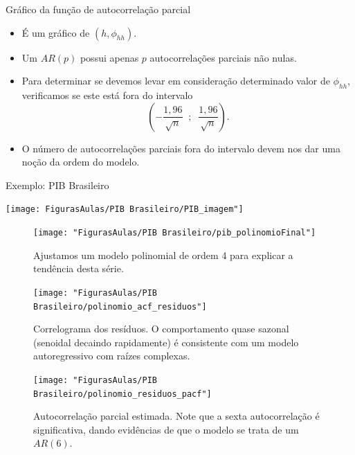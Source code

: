 \documentclass[
  letterpaper,
  DIV=11,
  numbers=noendperiod]{scrreprt}
\theoremstyle{definition}
\theoremstyle{plain}
\theoremstyle{definition}
\theoremstyle{plain}
\theoremstyle{remark}
\begin{document}
\begin{frame}{Gráfico da função de autocorrelação parcial}
    \begin{itemize}
        \item É um gráfico de $(h,\phi_{hh})$.
        \item Um $AR(p)$ possui apenas $p$ autocorrelações parciais não nulas.
        \item Para determinar se devemos levar em consideração determinado valor de $\phi_{hh}$, verificamos se este está fora do intervalo
        $$(-\frac{1,96}{\sqrt{n}}\;\;;\;\;\frac{1,96}{\sqrt{n}}).$$
        \item O número de autocorrelações parciais fora do intervalo devem nos dar uma noção da ordem do modelo.
    \end{itemize}
    
\end{frame}

\begin{frame}{Exemplo: PIB Brasileiro}
\begin{center}
\texttt{[image: FigurasAulas/PIB Brasileiro/PIB\_imagem"]}
\end{center}
\end{frame}

\begin{frame}
\begin{figure}
\centering
\texttt{[image: "FigurasAulas/PIB Brasileiro/pib\_polinomioFinal"]}
\caption{Ajustamos um modelo polinomial de ordem 4 para explicar a tendência desta série.}
\label{fig:pib_polinomioFinal}
\end{figure}
\end{frame}

\begin{frame}
    \begin{figure}
\centering
\texttt{[image: "FigurasAulas/PIB Brasileiro/polinomio\_acf\_residuos"]}
\caption{Correlograma dos resíduos. O comportamento quase sazonal (senoidal decaindo rapidamente) é consistente com um modelo autoregressivo com raízes complexas.}
\label{fig:polinomio_acf_residuos}
\end{figure}
\end{frame}

\begin{frame}
    \begin{figure}
\centering
\texttt{[image: "FigurasAulas/PIB Brasileiro/polinomio\_residuos\_pacf"]}
\caption{Autocorrelação parcial estimada. Note que a sexta autocorrelação é significativa, dando evidências de que o modelo se trata de um $AR(6)$.}
\label{fig:polinomio_residuos_pacf}
\end{figure}
\end{frame}
\end{document}
